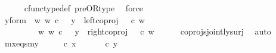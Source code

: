 \begin{isabellebody}
\ \ \ \ \isamarkupfalse%
\ cfunc{\isacharunderscore}{\kern0pt}type{\isacharunderscore}{\kern0pt}def\ pre{\isacharunderscore}{\kern0pt}OR{\isacharunderscore}{\kern0pt}type\ \isamarkupfalse%
\ force\isanewline
\ \ \isamarkupfalse%
\ \isamarkupfalse%
\ y{\isacharunderscore}{\kern0pt}form{\isacharcolon}{\kern0pt}\ {\isachardoublequoteopen}{\isacharparenleft}{\kern0pt}{\isasymexists}\ w{\isachardot}{\kern0pt}\ {\isacharparenleft}{\kern0pt}w\ {\isasymin}\isactrlsub c\ {\isasymone}\ {\isasymand}\ y\ {\isacharequal}{\kern0pt}\ {\isacharparenleft}{\kern0pt}left{\isacharunderscore}{\kern0pt}coproj\ {\isasymone}\ {\isacharparenleft}{\kern0pt}{\isasymone}{\isasymCoprod}{\isasymone}{\isacharparenright}{\kern0pt}{\isacharparenright}{\kern0pt}\ {\isasymcirc}\isactrlsub c\ w{\isacharparenright}{\kern0pt}{\isacharparenright}{\kern0pt}\isanewline
\ \ \ \ \ \ {\isasymor}\ \ {\isacharparenleft}{\kern0pt}{\isasymexists}\ w{\isachardot}{\kern0pt}\ {\isacharparenleft}{\kern0pt}w\ {\isasymin}\isactrlsub c\ {\isacharparenleft}{\kern0pt}{\isasymone}{\isasymCoprod}{\isasymone}{\isacharparenright}{\kern0pt}\ {\isasymand}\ y\ {\isacharequal}{\kern0pt}\ {\isacharparenleft}{\kern0pt}right{\isacharunderscore}{\kern0pt}coproj\ {\isasymone}\ {\isacharparenleft}{\kern0pt}{\isasymone}{\isasymCoprod}{\isasymone}{\isacharparenright}{\kern0pt}{\isacharparenright}{\kern0pt}\ {\isasymcirc}\isactrlsub c\ w{\isacharparenright}{\kern0pt}{\isacharparenright}{\kern0pt}{\isachardoublequoteclose}\isanewline
\ \ \ \ \isamarkupfalse%
\ coprojs{\isacharunderscore}{\kern0pt}jointly{\isacharunderscore}{\kern0pt}surj\ \isamarkupfalse%
\ auto\isanewline
\isanewline
\ \ \isamarkupfalse%
\ mx{\isacharunderscore}{\kern0pt}eqs{\isacharunderscore}{\kern0pt}my{\isacharcolon}{\kern0pt}\ {\isachardoublequoteopen}{\isasymlangle}{\isasymt}{\isacharcomma}{\kern0pt}{\isasymt}{\isasymrangle}\ {\isasymamalg}\ {\isasymlangle}{\isasymt}{\isacharcomma}{\kern0pt}{\isasymf}{\isasymrangle}\ {\isasymamalg}\ {\isasymlangle}{\isasymf}{\isacharcomma}{\kern0pt}{\isasymt}{\isasymrangle}\ {\isasymcirc}\isactrlsub c\ x\ {\isacharequal}{\kern0pt}\ {\isasymlangle}{\isasymt}{\isacharcomma}{\kern0pt}{\isasymt}{\isasymrangle}\ {\isasymamalg}\ {\isasymlangle}{\isasymt}{\isacharcomma}{\kern0pt}{\isasymf}{\isasymrangle}\ {\isasymamalg}\ {\isasymlangle}{\isasymf}{\isacharcomma}{\kern0pt}{\isasymt}{\isasymrangle}\ {\isasymcirc}\isactrlsub c\ y{\isachardoublequoteclose}\isanewline
\isanewline
\ \ \isamarkupfalse%

\end{isabellebody}
